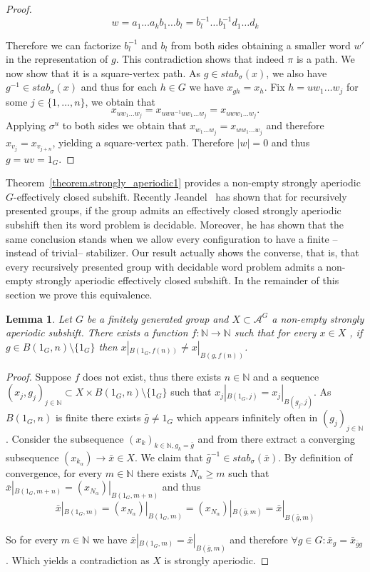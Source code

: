 \documentclass[letterpaper]{article}
\theoremstyle{plain}
\newtheorem{lemma}[theorem]{Lemma}
\def\NN{\mathbb{N}}
\def\ag{\mathcal{A}}
\newcommand{\cor}[2][]{#2}
\begin{document}
\begin{proof}
			$$w = a_1\dots a_k b_1 \dots b_l = b_l^{-1} \dots b_1^{-1}d_1\dots d_k$$
			
			Therefore we can factorize $b_l^{-1}$ and $b_l$ from both sides obtaining a smaller word $w'$ in the representation of $g$. This contradiction shows that indeed $\pi$ is a path. We now show that it is a square-vertex path. As $g\in stab_{\sigma}(x)$, we also have $g^{-1} \in stab_{\sigma}(x)$ and thus for each $h \in G$ we have $x_{gh} = x_{h}$. Fix $h = uw_1\dots w_j$ for some $j \in \{1,\dots,n\}$, we obtain that $$x_{uw_1\dots w_j} = x_{uwu^{-1}uw_1\dots w_j} = x_{uww_1\dots w_j}.$$
			Applying $\sigma^{u}$ to both sides we obtain that $x_{w_1\dots w_j} = x_{ww_1\dots w_j}$ and therefore $x_{v_j} = x_{v_{j+n}}$, yielding a square-vertex path. Therefore $|w| = 0$ and thus $g = uv = 1_G$.
		\end{proof}
		
		Theorem~\ref{theorem.strongly_aperiodic1} provides a non-empty strongly aperiodic $G$-effectively closed subshift. Recently Jeandel~\cite{Jeandel2015} has shown that for recursively presented groups, if the group admits an effectively closed strongly aperiodic subshift then its word problem is decidable. Moreover, he has shown that the same conclusion stands when we allow every configuration to have a finite --instead of trivial-- stabilizer. Our result actually shows the converse, that is, that every recursively presented group with decidable word problem admits a non-empty strongly aperiodic effectively closed subshift. In the remainder of this section we prove this equivalence.
		
		\begin{lemma}\label{compacityfunctionaperiodic}
			Let $G$ be a finitely generated group and $X \subset \ag^G$ a non-empty strongly aperiodic subshift. There exists a function $f: \NN \to \NN$ such that for every $x \in X$ \cor[then]{, if} $g \in B(1_G,n) \setminus \{1_G\}$ \cor[$\implies$]{then} $x|_{B(1_G,f(n))} \neq x|_{B(g,f(n))}$.
		\end{lemma}
		
		\begin{proof}
			Suppose $f$ does not exist, thus there exists $n \in \NN$ and a sequence $(x_j,g_j)_{j \in \NN} \subset X\times  B(1_G,n) \setminus\{1_G\}$ such that $x_j|_{B(1_G,j)} = x_j|_{B(g_j,j)}$. As $B(1_G,n)$ is finite there exists $\bar{g} \neq 1_G$ which appears infinitely often in $(g_j)_{j \in \NN}$. Consider the subsequence $(x_k)_{k \in \NN, g_{k} = \bar{g}}$ and from there extract a  converging subsequence $(x_{k_{\alpha}}) \to \bar{x} \in X$. We claim that $\bar{g}^{-1} \in stab_{\sigma}(\bar{x})$. By definition of convergence, for every $m \in \NN$ there exists $N_{\alpha} \geq m$ such that $\bar{x}|_{B(1_G,m+n)} = (x_{N_{\alpha}})|_{B(1_G,m+n)}$ and thus $$\bar{x}|_{B(1_G,m)} = (x_{N_{\alpha}})|_{B(1_G,m)} = (x_{N_{\alpha}})|_{B(\bar{g},m)} = \bar{x}|_{B(\bar{g},m)}$$
			
			So for every $m \in \NN$ we have $\bar{x}|_{B(1_G,m)} = \bar{x}|_{B(\bar{g},m)}$ and therefore $\forall g \in G: \bar{x}_g = \bar{x}_{\bar{g}g}$. Which yields a contradiction as $X$ is strongly aperiodic. \end{proof}
		
\end{document}
